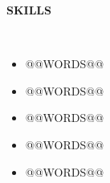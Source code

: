 \documentclass[a4paper,10pt]{article}
\newcommand{\resheading}[1]{{\small \colorbox{mygrey}{\begin{minipage}{0.99\textwidth}{\textbf{#1 \vphantom{p\^{E}}}}\end{minipage}}}}
\begin{document}
\noindent
\resheading{\textbf{SKILLS}}\\[-0.4cm]
 \begin{itemize}
  \item @@WORDS@@\\[-0.6cm]
  \item @@WORDS@@\\[-0.6cm]
  \item @@WORDS@@\\[-0.6cm]
  \item @@WORDS@@\\[-0.6cm]
  \item @@WORDS@@\\[-0.6cm]
\end{itemize}
\end{document}
